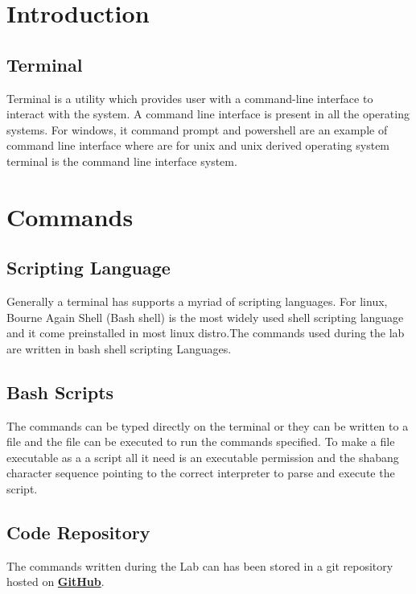\documentclass{article}
\begin{document}
\clearpage
{}
\section{Introduction}
\subsection{Terminal}
Terminal is a utility which provides user with a command-line interface to interact with the system. A command line interface is present in all the operating systems. For windows, it command prompt and powershell are an example of command line interface where are for unix and unix derived operating system terminal is the command line interface system.


\section{Commands}
\subsection{Scripting Language}
Generally a terminal has supports a myriad of scripting languages. For linux, Bourne Again Shell (Bash shell) is the most widely used shell scripting language and it come preinstalled in most linux distro.The commands used during the lab are written in bash shell scripting Languages.

\subsection{Bash Scripts}
The commands can be typed directly on the terminal or they can be written to a file and the file can be executed to run the commands specified. To make a file executable as a a script all it need is an executable permission and the shabang character sequence pointing to the correct interpreter to parse and execute the script.

\subsection{Code Repository}
The commands written during the Lab can has been stored in a git repository hosted on \href{https://github.com/AayushPokharel/LabAssignment4}{\textbf{GitHub}}.
\end{document}
